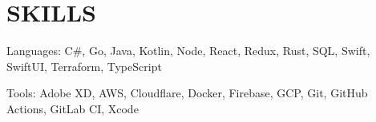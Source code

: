 \section{SKILLS}
\begin{bulletlist}
   \item{Languages: C\#, Go, Java, Kotlin, Node, React, Redux, Rust, SQL, Swift, SwiftUI, Terraform, TypeScript}
   \item{Tools: Adobe XD, AWS, Cloudflare, Docker, Firebase, GCP, Git, GitHub Actions, GitLab CI, Xcode}
\end{bulletlist}
